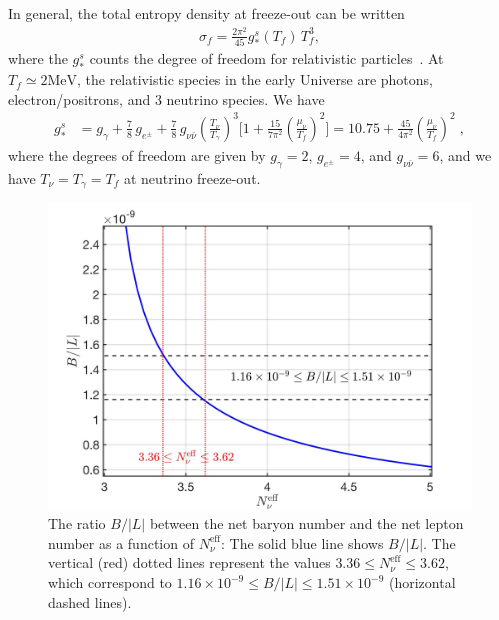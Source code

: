 In general, the total entropy density at freeze-out can be written
\begin{align}
\label{eq:EntropyDensity}
\sigma_f=\frac{2\pi^2}{45}g^s_\ast(T_f)\,T_f^3,
\end{align}
where the $g^s_\ast$ counts the degree of freedom for relativistic particles~\cite{Kolb:1990vq}. At $T_f\simeq 2\mathrm{MeV}$, the relativistic species in the early Universe are photons, electron/positrons, and $3$ neutrino species. We have
\begin{align}
g^s_{\ast}&= g_\gamma+\frac{7}{8}\,g_{e^\pm}+\frac{7}{8}\,g_{\nu\bar{\nu}}\left(\frac{T_\nu}{T_\gamma}\right)^{\!\!3}\bigg[1+\frac{15}{7\pi^2}\left(\frac{\mu_\nu}{T_f}\right)^{\!\!2}\bigg]=10.75+\frac{45}{4\pi^2}\left(\frac{\mu_\nu}{T_f}\right)^{\!\!2}\;,
\end{align}
where the degrees of freedom are given by $g_\gamma=2$, $g_{e^\pm}=4$, and $g_{\nu\bar{\nu}}=6$, and we have $T_\nu=T_\gamma=T_f$ at neutrino freeze-out.

\begin{figure}
\begin{center}
\includegraphics[width=0.8\linewidth]{./plots/Ratio_BL}
\caption{The ratio $B/|L|$ between the net baryon number and the net lepton number as a function of $N^{\mathrm{eff}}_\nu$: The solid blue line shows $B/|L|$. The vertical (red) dotted lines represent the values $3.36\leqslant N_\nu^{\mathrm{eff}}\leqslant3.62$, which correspond to $1.16 \times 10^{-9}\leqslant B/|L|\leqslant 1.51 \times 10^{-9}$ (horizontal dashed lines). }
\label{fig:BLRatio}
\end{center}
\end{figure}

